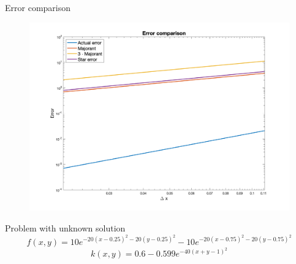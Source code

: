 \documentclass{beamer}
\begin{document}
    \begin{frame}{Error comparison}
        \begin{figure}
            \includegraphics[scale=0.18]{errors}
        \end{figure}
    \end{frame}

    \begin{frame}{Problem with unknown solution}
        \begin{equation*}
            f(x, y) = 10 e^{-20(x - 0.25)^2 -20(y - 0.25)^2} - 10 e^{-20(x - 0.75)^2 -20(y - 0.75)^2}
        \end{equation*}
        \begin{equation*}
            k(x, y) = 0.6 - 0.599e^{-40(x + y - 1)^2}
        \end{equation*}
        
        \begin{figure}
            \centering
            \centering
        \end{figure}
    \end{frame}
\end{document}
